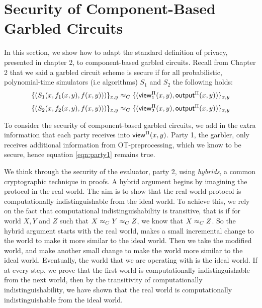 \section{Security of Component-Based Garbled Circuits}

In this section, we show how to adapt the standard definition of privacy, presented in chapter 2, to component-based garbled circuits.
Recall from Chapter 2 that we said a garbled circuit scheme is secure if for all probabilistic, polynomial-time simulators (i.e algorithms) $S_1$ and $S_2$ the following holds:
\begin{equation}
\label{eqn:party1}
    \{(S_1(x, f_1(x,y), f(x,y)))\}_{x,y} \approx_C \{({\sf view}^{\Pi}_1(x,y), {\sf output}^{\Pi}(x,y)) \}_{x,y}
\end{equation}
\begin{equation}
\label{eqn:party2}
    \{(S_2(x, f_2(x,y), f(x,y)))\}_{x,y} \approx_C \{({\sf view}^{\Pi}_2(x,y), {\sf output}^{\Pi}(x,y)) \}_{x,y}
\end{equation}

To consider the security of component-based garbled circuits, we add in the extra information that each party receives into ${\sf view}^{\Pi}(x,y)$. 
Party 1, the garbler, only receives additional information from OT-preprocessing, which we know to be secure, hence equation \ref{eqn:party1} remains true. 

We think through the security of the evaluator, party 2, using \textit{hybrids}, a common cryptographic technique in proofs. 
A hybrid argument begins by imagining the protocol in the real world. 
The aim is to show that the real world protocol is computationally indistinguishable from the ideal world. 
To achieve this, we rely on the fact that computational indistinguishability is transitive, that is if for world $X, Y$ and $Z$ such that $X \approx_C Y \approx_C Z$, we know that $X \approx_C Z$. 
So the hybrid argument starts with the real world, makes a small incremental change to the world to make it more similar to the ideal world.
Then we take the modified world, and make another small change to make the world more similar to the ideal world. 
Eventually, the world that we are operating with is the ideal world. 
If at every step, we prove that the first world is computationally indistinguishable from the next world, then by the transitivity of computationally indistinguishability, we have shown that the real world is computationally indistinguishable from the ideal world. 

